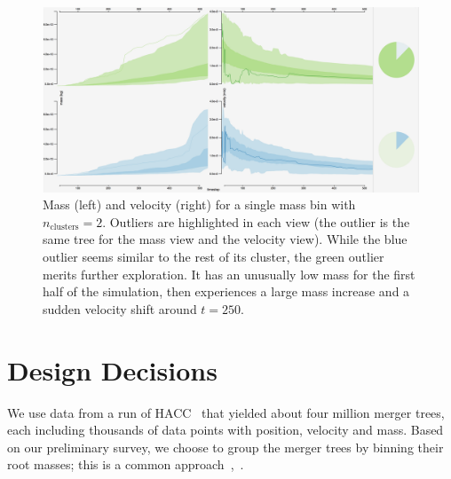 
\begin{figure}[h]
\includegraphics[width=\textwidth]{images/clusters/n2_mass_velocity_outliers}
\caption{Mass (left) and velocity (right) for a single mass bin with $n_{\mathrm{clusters}}=2$. Outliers are highlighted in each view (the outlier is the same tree for the mass view and the velocity view). While the blue outlier seems similar to the rest of its cluster, the green outlier merits further exploration. It has an unusually low mass for the first half of the simulation, then experiences a large mass increase and a sudden velocity shift around $t=250$.}
\label{vel_example}
\end{figure}


\section{Design Decisions}


We use data from a run of HACC~\cite{hacc} that yielded about four million merger trees, each including thousands of data points with position, velocity and mass. Based on our preliminary survey, we choose to group the merger trees by binning their root masses; this is a common approach~\cite{masshistory},~\cite{assemblyhistory}.

